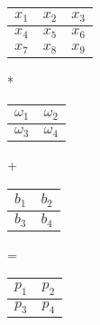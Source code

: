 \documentclass{article}
\begin{document}
\centering
\begin{figure}[htbp]
    \begin{minipage}{0.20\linewidth}
        \begin{tabular}{|c|c|c|}%
            \hline  %
            $x_1$ & $x_2$ & $x_3$ \\
            \hline  %
            $x_4$ & $x_5$ & $x_6$ \\
            \hline %
            $x_7$ & $x_8$ & $x_9$ \\
            \hline
        \end{tabular}
    \end{minipage}
    *
    \begin{minipage}{0.13\linewidth}
        \begin{tabular}{|c|c|}%
            \hline  %
            $\omega_1$ & $\omega_2$ \\
            \hline  %
            $\omega_3$ & $\omega_4$ \\
            \hline
        \end{tabular}
    \end{minipage}
    +
    \begin{minipage}{0.12\linewidth}
        \begin{tabular}{|c|c|}%
            \hline  %
            $b_1$ & $b_2$ \\
            \hline  %
            $b_3$ & $b_4$ \\
            \hline
        \end{tabular}
    \end{minipage}
    =
    \begin{minipage}{0.12\linewidth}
        \begin{tabular}{|c|c|}%
            \hline  %
            $p_1$ & $p_2$ \\
            \hline  %
            $p_3$ & $p_4$ \\
            \hline
        \end{tabular}
    \end{minipage}
\end{figure}
\end{document}
